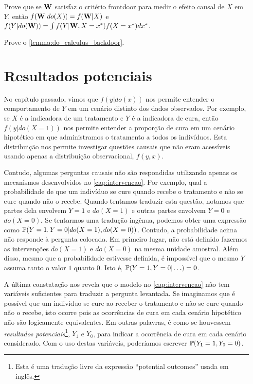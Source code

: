 \begin{exercise}
 \label{lemma:frontdoor_backdoor}
 Prove que se $\W$ satisfaz o critério frontdoor para
 medir o efeito causal de $X$ em $Y$, então
 $f(\W|do(X)) = f(\W|X)$ e
 $f(Y|do(\W)) = \int f(Y|\W,X=x^*)f(X=x^*)dx^*$.
\end{exercise}

\begin{exercise}
 Prove o \cref{lemma:do_calculus_backdoor}.
\end{exercise}

\chapter{Resultados potenciais}

No capítulo passado, vimos que
$f(y|do(x))$ nos permite entender
o comportamento de $Y$ em 
um cenário distinto dos dados observados.
Por exemplo, se $X$ é 
a indicadora de um tratamento e
$Y$ é a indicadora de cura, então
$f(y|do(X=1))$ nos permite entender
a proporção de cura em um cenário hipotético em que
administramos o tratamento a todos os indivíduos.
Esta distribuição nos permite investigar
questões causais que 
não eram acessíveis usando apenas
a distribuição observacional, $f(y,x)$.

Contudo, algumas perguntas causais 
não são respondidas utilizando apenas
os mecanismos desenvolvidos no \cref{cap:intervencao}.
Por exemplo, qual a probabilidade de que 
um indivíduo se cure quando recebe o tratamento e
não se cure quando não o recebe.
Quando tentamos traduzir esta questão,
notamos que partes dela envolvem $Y=1$ e $do(X=1)$
e outras partes envolvem $Y=0$ e $do(X=0)$.
Se tentarmos uma tradução ingênua,
podemos obter uma expressão como $\P(Y=1, Y=0|do(X=1),do(X=0))$.
Contudo, a probabilidade acima não responde à pergunta colocada.
Em primeiro lugar, não está definido fazermos
as intervenções $do(X=1)$ e $do(X=0)$ na mesma unidade amostral.
Além disso, mesmo que a probabilidade estivesse definida,
é impossível que o mesmo $Y$ assuma tanto o valor $1$ quanto $0$.
Isto é, $\P(Y=1, Y=0|\ldots) = 0$.

A última constatação nos revela que
o modelo no \cref{cap:intervencao}
não tem variáveis suficientes para
traduzir a pergunta levantada.
Se imaginamos que é possível que
um indivíduo se cure ao receber o tratamento e
não se cure quando não o recebe, 
isto ocorre pois as ocorrências de cura
em cada cenário hipotético não são 
logicamente equivalentes.
Em outras palavras, é como se 
houvessem \textit{resultados potenciais}\footnote{
 Esta é uma tradução livre da expressão
 ``potential outcomes'' usada em inglês.},
$Y_1$ e $Y_0$, para
indicar a ocorrência de cura em
cada cenário considerado.
Com o uso destas variáveis, 
poderíamos escrever 
$\P(Y_1 = 1, Y_0 = 0)$.

